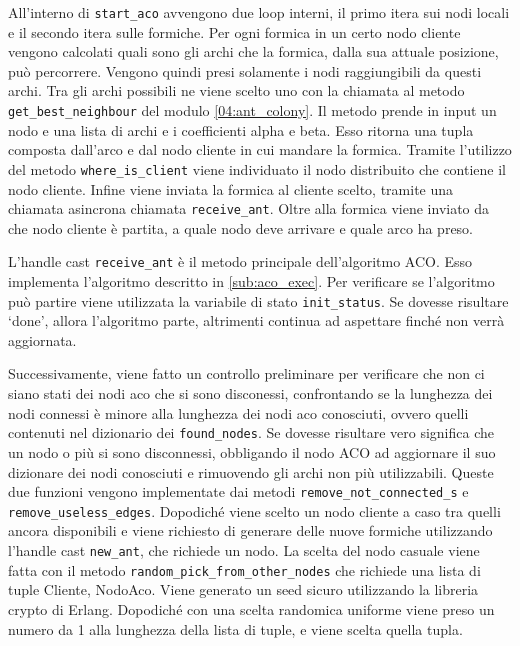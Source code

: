 All'interno di \texttt{start\_aco} avvengono due loop interni, il primo itera sui nodi locali e il secondo itera sulle formiche. 
Per ogni formica in un certo nodo cliente vengono calcolati quali sono gli archi che la formica, dalla sua attuale posizione, può percorrere. Vengono quindi presi solamente i nodi raggiungibili da questi archi.
Tra gli archi possibili ne viene scelto uno con la chiamata al metodo \texttt{get\_best\_neighbour} del modulo \ref{04:ant_colony}. 
Il metodo prende in input un nodo e una lista di archi e i coefficienti alpha e beta.
Esso ritorna una tupla composta dall'arco e dal nodo cliente in cui mandare la formica. Tramite l'utilizzo del metodo \texttt{where\_is\_client} viene individuato il nodo distribuito che contiene il nodo cliente.
Infine viene inviata la formica al cliente scelto, tramite una chiamata asincrona chiamata \texttt{receive\_ant}. Oltre alla formica viene inviato da che nodo cliente è partita, a quale nodo deve arrivare e quale arco ha preso.

L'handle cast \texttt{receive\_ant} è il metodo principale dell'algoritmo ACO. 
Esso implementa l'algoritmo descritto in \ref{sub:aco_exec}. Per verificare se l'algoritmo può partire viene utilizzata la variabile di stato \texttt{init\_status}.
Se dovesse risultare `done', allora l'algoritmo parte, altrimenti continua ad aspettare finché non verrà aggiornata.

Successivamente, viene fatto un controllo preliminare per verificare che non ci siano stati dei nodi aco che si sono disconessi, confrontando se la lunghezza dei nodi connessi è minore alla lunghezza dei nodi aco conosciuti, ovvero quelli contenuti nel dizionario dei \texttt{found\_nodes}.
Se dovesse risultare vero significa che un nodo o più si sono disconnessi, obbligando il nodo ACO ad aggiornare il suo dizionare dei nodi conosciuti e rimuovendo gli archi non più utilizzabili. 
Queste due funzioni vengono implementate dai metodi \texttt{remove\_not\_connected\_s} e \texttt{remove\_useless\_edges}.
Dopodiché viene scelto un nodo cliente a caso tra quelli ancora disponibili e viene richiesto di generare delle nuove formiche utilizzando l'handle cast \texttt{new\_ant}, che richiede un nodo.
La scelta del nodo casuale viene fatta con il metodo \texttt{random\_pick\_from\_other\_nodes} che richiede una lista di tuple {Cliente, NodoAco}. Viene generato un seed sicuro utilizzando la libreria crypto di Erlang. Dopodiché con una scelta randomica uniforme viene preso un numero da 1 alla lunghezza della lista di tuple, e viene scelta quella tupla.

